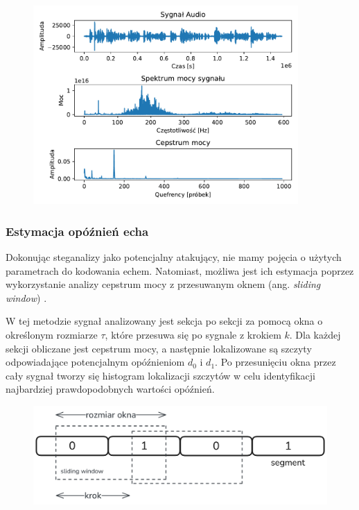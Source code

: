 \begin{figure}[ht!]
	\centering
	\includegraphics[width=0.9\textwidth]{./img/plot_echo_signal_spectrum_cepstrum.pdf}
\end{figure}

\subsubsection{Estymacja opóźnień echa}

Dokonując steganalizy jako potencjalny atakujący, nie mamy pojęcia o użytych parametrach do kodowania echem. Natomiast, możliwa jest ich estymacja poprzez wykorzystanie analizy cepstrum mocy z przesuwanym oknem (ang. \textit{sliding window}) \cite{echo_swc}.

W tej metodzie sygnał analizowany jest sekcja po sekcji za pomocą okna o określonym rozmiarze $\tau$, które przesuwa się po sygnale z krokiem $k$. Dla każdej sekcji obliczane jest cepstrum mocy, a następnie lokalizowane są szczyty odpowiadające potencjalnym opóźnieniom $d_0$ i $d_1$. Po przesunięciu okna przez cały sygnał tworzy się histogram lokalizacji szczytów w celu identyfikacji najbardziej prawdopodobnych wartości opóźnień.

\begin{figure}[ht!]
	\centering
	\includegraphics[width=\textwidth]{./img/echo-sliding-window.png}
\end{figure}

